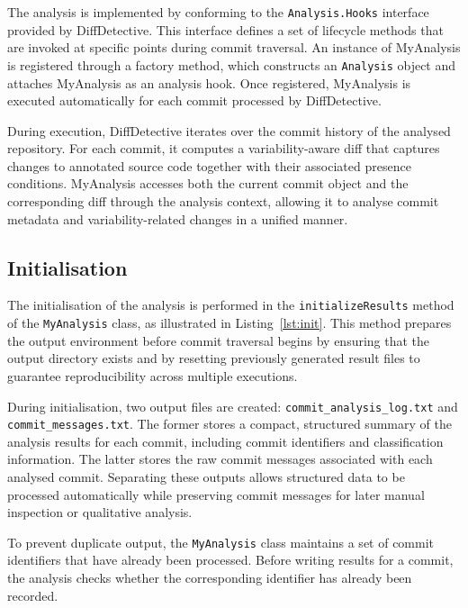 The analysis is implemented by conforming to the \texttt{Analysis.Hooks} interface provided by DiffDetective. This interface defines a set of lifecycle methods that are invoked at specific points during commit traversal. An instance of MyAnalysis is registered through a factory method, which constructs an \texttt{Analysis} object and attaches MyAnalysis as an analysis hook. Once registered, MyAnalysis is executed automatically for each commit processed by DiffDetective.

During execution, DiffDetective iterates over the commit history of the analysed repository. For each commit, it computes a variability-aware diff that captures changes to annotated source code together with their associated presence conditions. MyAnalysis accesses both the current commit object and the corresponding diff through the analysis context, allowing it to analyse commit metadata and variability-related changes in a unified manner.

\subsection{Initialisation}

The initialisation of the analysis is performed in the \texttt{initializeResults} method of the \texttt{MyAnalysis} class, as illustrated in Listing~\ref{lst:init}. This method prepares the output environment before commit traversal begins by ensuring that the output directory exists and by resetting previously generated result files to guarantee reproducibility across multiple executions.

During initialisation, two output files are created: \texttt{commit\_analysis\_log.txt} and \texttt{commit\_messages.txt}. The former stores a compact, structured summary of the analysis results for each commit, including commit identifiers and classification information. The latter stores the raw commit messages associated with each analysed commit. Separating these outputs allows structured data to be processed automatically while preserving commit messages for later manual inspection or qualitative analysis.

To prevent duplicate output, the \texttt{MyAnalysis} class maintains a set of commit identifiers that have already been processed. Before writing results for a commit, the analysis checks whether the corresponding identifier has already been recorded.


\clearpage

